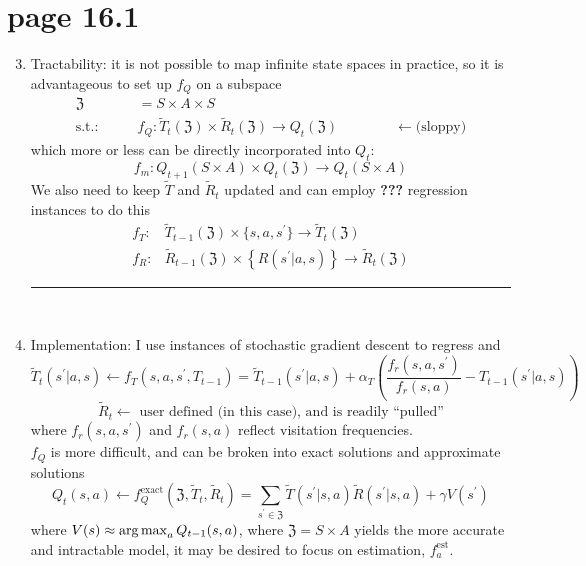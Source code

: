\section*{page 16.1}

\begin{enumerate}[label=\protect\textcircled{\arabic*}]
\setcounter{enumi}{2}
\item Tractability: it is not possible to map infinite state spaces in practice, so it is advantageous to set up $f_Q$ on a 
subspace \begin{align*}
\mathfrak{Z} & = S \times A \times S \\
\text{s.t.:}\qquad & f_Q: \tilde{T}_t( \mathfrak{Z} ) \times \tilde{R}_t ( \mathfrak{Z} ) \rightarrow Q_t( \mathfrak{Z} )\qquad\qquad \leftarrow\text{(sloppy)}
\end{align*}
which more or less can be directly incorporated into $Q_t$:
\begin{equation*}
f_m: Q_{t+1}( S \times A ) \times Q_t(\mathfrak{Z}) \rightarrow Q_t(S\times A)
\end{equation*}
We also need to keep $\tilde{T}$ and $\tilde{R}_t$ updated and can employ \textbf{???} regression instances to do this
\begin{align*}
f_T: & \tilde{T}_{t-1}(\mathfrak{Z})\times\{s,a,s^\prime\}\rightarrow \tilde{T}_t(\mathfrak{Z}) \\
f_R: & \tilde{R}_{t-1}( \mathfrak{Z} ) \times \left\{  R( s^\prime | a, s ) \right\} \rightarrow \tilde{R}_t( \mathfrak{Z} )
\end{align*}
\hrule
{\ }\\

\item Implementation: I use instances of stochastic gradient descent to regress  and 
\begin{equation*}
\tilde{T}_t(s^\prime | a, s ) \leftarrow f_T(s,a,s^\prime,T_{t-1}) = \tilde{T}_{t-1}(s^\prime|a,s)+\alpha_T\left(\frac{f_r(s,a,s^\prime)}{f_r(s,a)}-T_{t-1}(s^\prime|a,s)\right)
\end{equation*}
\begin{equation*}
\tilde{R}_t \leftarrow\text{\ user defined (in this case), and is readily ``pulled''}
\end{equation*}
where $f_r(s,a,s^\prime)$ and $f_r(s,a)$ reflect visitation frequencies.\\

$f_Q$ is more difficult, and can be broken into exact solutions and approximate solutions
\begin{equation*}
Q_t(s,a) \leftarrow f_Q^{\text{exact}}\left( \mathfrak{Z}, \tilde{T}_t, \tilde{R}_t \right) = \sum_{s^\prime \in \mathfrak{Z}} \tilde{T}(s^\prime|s,a) \tilde{R}(s^\prime|s,a) +\gamma V(s^\prime)
\end{equation*}
where $V(s)\approx \operatorname*{arg\,max}_{a} Q_{t-1}(s,a)$, where $\mathfrak{Z}=S \times A$ yields the more accurate and intractable model, it may be desired to focus on estimation, $f_a^{\text{est}}$.

\end{enumerate}